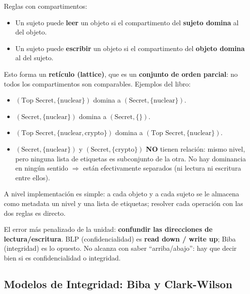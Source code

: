 \documentclass[../main.tex]{subfiles}
\begin{document}
Reglas con compartimentos:
\begin{itemize}[nosep]
  \item Un sujeto puede \textbf{leer} un objeto si el compartimento del \textbf{sujeto domina} al del objeto.
  \item Un sujeto puede \textbf{escribir} un objeto si el compartimento del \textbf{objeto domina} al del sujeto.
\end{itemize}

Esto forma un \textbf{retículo (lattice)}, que es un \textbf{conjunto de orden parcial}: no todos los compartimentos son comparables. Ejemplos del libro:
\begin{itemize}[nosep]
  \item $(\text{Top Secret},\{\text{nuclear}\})$ domina a $(\text{Secret},\{\text{nuclear}\})$.
  \item $(\text{Secret},\{\text{nuclear}\})$ domina a $(\text{Secret},\{\})$.
  \item $(\text{Top Secret},\{\text{nuclear},\text{crypto}\})$ domina a $(\text{Top Secret},\{\text{nuclear}\})$.
  \item $(\text{Secret},\{\text{nuclear}\})$ y $(\text{Secret},\{\text{crypto}\})$ \textbf{NO} tienen relación: mismo nivel, pero ninguna lista de etiquetas es subconjunto de la otra. No hay dominancia en ningún sentido $\Rightarrow$ están efectivamente separados (ni lectura ni escritura entre ellos).
\end{itemize}

A nivel implementación es simple: a cada objeto y a cada sujeto se le almacena como metadata un nivel y una lista de etiquetas; resolver cada operación con las dos reglas es directo.

\begin{ojo}
El error más penalizado de la unidad: \textbf{confundir las direcciones de lectura/escritura}. BLP (confidencialidad) es \textbf{read down / write up}; Biba (integridad) es lo opuesto. No alcanza con saber ``arriba/abajo'': hay que decir bien si es confidencialidad o integridad.
\end{ojo}

\subsection{Modelos de Integridad: Biba y Clark-Wilson}
\end{document}
